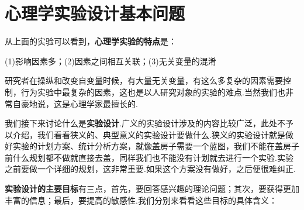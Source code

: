 \section{心理学实验设计基本问题}

从上面的实验可以看到，\textbf{心理学实验的特点}是：

(1)影响因素多；(2)因素之间相互关联；(3)无关变量的混淆

研究者在操纵和改变自变量时候，有大量无关变量，有这么多复杂的因素需要控制，行为实验中最复杂的因素，这也是以人研究对象的实验的难点.当然我们也非常自豪地说，这是心理学家最擅长的.

我们接下来讨论什么是\textbf{实验设计}.广义的实验设计涉及的内容比较广泛，此处不予以介绍，我们看看狭义的、典型意义的实验设计要做什么.狭义的实验设计就是做好实验的计划方案、统计分析方案，就像盖房子需要一个蓝图，我们不能在盖房子前什么规划都不做就直接去盖，同样我们也不能没有计划就去进行一个实验.实验之前要做一个详细的规划，这非常重要.如果这个方案没有做好，之后便很难纠正.

\textbf{实验设计的主要目标}有三点，首先，要回答感兴趣的理论问题；其次，要获得更加丰富的信息；最后，要提高的敏感性.我们分别来看看这些目标的具体含义：

